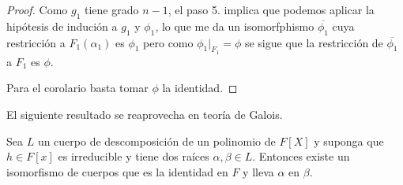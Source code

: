 \begin{proof}

	Como $g_1$ tiene grado $n-1$, el paso 5. implica que podemos aplicar la hipótesis de indución a $g_1$ y $\phi_1$, lo que me da un isomorfphismo $\overline{\phi_1}$ cuya restricción a $F_1(\alpha_1)$ es $\phi_1$ pero como $\phi_1|_{F_1} = \phi$ se sigue que la restricción de $\overline{\phi_1}$ a $F_1$ es $\phi$. 
	
	Para el corolario basta tomar $\phi$ la identidad. 
\end{proof}

El siguiente resultado se reaprovecha en teoría de Galois. 

\begin{proposition}
	Sea $L$ un cuerpo de descomposición de un polinomio de $F[X]$ y suponga que $h \in F[x]$ es irreducible y tiene dos raíces $\alpha,\beta \in L$. Entonces existe un isomorfismo de cuerpos que es la identidad en $F$ y lleva $\alpha$ en $\beta$. 
\end{proposition}




